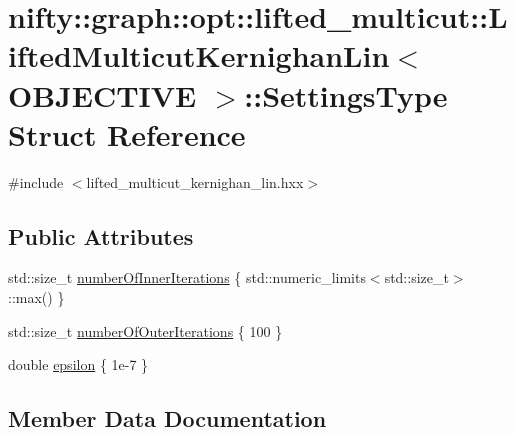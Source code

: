 \hypertarget{structnifty_1_1graph_1_1opt_1_1lifted__multicut_1_1LiftedMulticutKernighanLin_1_1SettingsType}{}\section{nifty\+:\+:graph\+:\+:opt\+:\+:lifted\+\_\+multicut\+:\+:Lifted\+Multicut\+Kernighan\+Lin$<$ O\+B\+J\+E\+C\+T\+I\+VE $>$\+:\+:Settings\+Type Struct Reference}
\label{structnifty_1_1graph_1_1opt_1_1lifted__multicut_1_1LiftedMulticutKernighanLin_1_1SettingsType}


{\ttfamily \#include $<$lifted\+\_\+multicut\+\_\+kernighan\+\_\+lin.\+hxx$>$}

\subsection*{Public Attributes}
\begin{DoxyCompactItemize}
\item 
std\+::size\+\_\+t \hyperlink{structnifty_1_1graph_1_1opt_1_1lifted__multicut_1_1LiftedMulticutKernighanLin_1_1SettingsType_aa7cd04eddd95ab3a171b728eb0d28365}{number\+Of\+Inner\+Iterations} \{ std\+::numeric\+\_\+limits$<$std\+::size\+\_\+t$>$\+::max() \}
\item 
std\+::size\+\_\+t \hyperlink{structnifty_1_1graph_1_1opt_1_1lifted__multicut_1_1LiftedMulticutKernighanLin_1_1SettingsType_ad01a16892b0f3a6613afe0b592f37819}{number\+Of\+Outer\+Iterations} \{ 100 \}
\item 
double \hyperlink{structnifty_1_1graph_1_1opt_1_1lifted__multicut_1_1LiftedMulticutKernighanLin_1_1SettingsType_a403707cad1a24a2d90e0a55cbd420aea}{epsilon} \{ 1e-\/7 \}
\end{DoxyCompactItemize}


\subsection{Member Data Documentation}
\mbox{\label{structnifty_1_1graph_1_1opt_1_1lifted__multicut_1_1LiftedMulticutKernighanLin_1_1SettingsType_a403707cad1a24a2d90e0a55cbd420aea}} 
